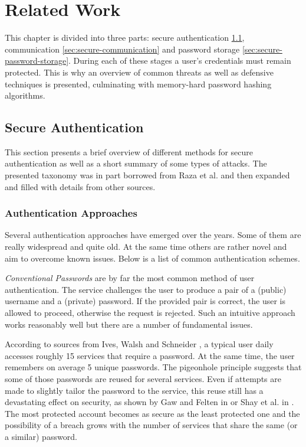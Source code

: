 \chapter{Related Work}
\label{chapter:related-work}

This chapter is divided into three parts: secure authentication \ref{sec:secure-authentication}, communication \ref{sec:secure-communication} and password storage \ref{sec:secure-password-storage}. During each of these stages a user's credentials must remain protected. This is why an overview of common threats as well as defensive techniques is presented, culminating with memory-hard password hashing algorithms.

\section{Secure Authentication}
\label{sec:secure-authentication}

This section presents a brief overview of different methods for secure authentication as well as a short summary of some types of attacks. The presented taxonomy was in part borrowed from Raza et al. \cite{raza:2012:password-attacks-survey} and then expanded and filled with details from other sources.

\subsection{Authentication Approaches}
\label{subsec:authentication-approaches}

Several authentication approaches have emerged over the years. Some of them are really widespread and quite old.  At the same time others are rather novel and aim to overcome known issues. Below is a list of common authentication schemes.

\emph{Conventional Passwords} are by far the most common method of user authentication. The service challenges the user to produce a pair of a (public) username and a (private) password. If the provided pair is correct, the user is allowed to proceed, otherwise the request is rejected. Such an intuitive approach works reasonably well but there are a number of fundamental issues.

 According to sources from Ives, Walsh and Schneider \cite{ives:2004:domino}, a typical user daily accesses roughly 15 services that require a password. At the same time, the user remembers on average 5 unique passwords. The pigeonhole principle suggests that some of those passwords are reused for several services. Even if attempts are made to slightly tailor the password to the service, this reuse still has a devastating effect on security, as shown by Gaw and Felten in \cite{gaw2006password} or Shay et al. in \cite{shay2010encountering}. The most protected account becomes as secure as the least protected one and the possibility of a breach grows with the number of services that share the same (or a similar) password.

